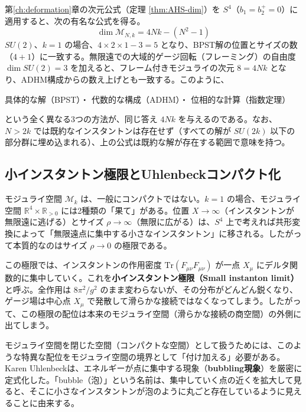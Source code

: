 \documentclass[uplatex, dvipdfmx, book]{jsbook}
\let\origsubsection\subsection
\let\origsubsubsection\subsubsection
\renewcommand{\section}{\origsubsection}
\renewcommand{\subsection}{\origsubsubsection}
\renewcommand{\subsubsection}{\paragraph}
\begin{document}
第\ref{ch:deformation}章の次元公式（定理 \ref{thm:AHS-dim}）を $S^4$（$b_1 = b_2^+ = 0$）に適用すると、次の有名な公式を得る。
\begin{equation}
    \dim \mathcal{M}_{N, k} = 4 N k - (N^2 - 1)
\end{equation}
$SU(2)$、$k=1$ の場合、$4 \times 2 \times 1 - 3 = 5$ となり、BPST解の位置とサイズの数（$4 + 1$）に一致する。無限遠での大域的ゲージ回転（フレーミング）の自由度 $\dim SU(2) = 3$ を加えると、フレーム付きモジュライの次元 $8 = 4Nk$ となり、ADHM構成からの数え上げとも一致する。このように、
\begin{center}
    具体的な解（BPST）\quad{}・\quad{} 代数的な構成（ADHM）\quad{}・\quad{} 位相的な計算（指数定理）
\end{center}
という全く異なる3つの方法が、同じ答え $4Nk$ を与えるのである。なお、$N > 2k$ では既約なインスタントンは存在せず（すべての解が $SU(2k)$ 以下の部分群に埋め込まれる）、上の公式は既約な解が存在する範囲で意味を持つ。

\section{小インスタントン極限とUhlenbeckコンパクト化}
\label{sec:uhlenbeck}

モジュライ空間 $\mathcal{M}_k$ は、一般にコンパクトではない。$k = 1$ の場合、モジュライ空間 $\mathbb{R}^4 \times \mathbb{R}_{>0}$ には2種類の「果て」がある。位置 $X \to \infty$（インスタントンが無限遠に逃げる）とサイズ $\rho \to \infty$（無限に広がる）は、$S^4$ 上で考えれば共形変換によって「無限遠点に集中する小さなインスタントン」に移される。したがって本質的なのはサイズ $\rho \to 0$ の極限である。

この極限では、インスタントンの作用密度 $\mathrm{Tr}(F_{\mu\nu}F_{\mu\nu})$ が一点 $X_\mu$ にデルタ関数的に集中していく。これを\textbf{小インスタントン極限（Small instanton limit）}と呼ぶ。全作用は $8\pi^2/g^2$ のまま変わらないが、その分布がどんどん鋭くなり、ゲージ場は中心点 $X_\mu$ で発散して滑らかな接続ではなくなってしまう。したがって、この極限の配位は本来のモジュライ空間（滑らかな接続の商空間）の外側に出てしまう。

モジュライ空間を閉じた空間（コンパクトな空間）として扱うためには、このような特異な配位をモジュライ空間の境界として「付け加える」必要がある。Karen Uhlenbeckは、エネルギーが点に集中する現象（\textbf{bubbling現象}）を厳密に定式化した\cite{uhlenbeck1982}。「bubble（泡）」という名前は、集中していく点の近くを拡大して見ると、そこに小さなインスタントンが泡のように丸ごと存在しているように見えることに由来する。
\end{document}
